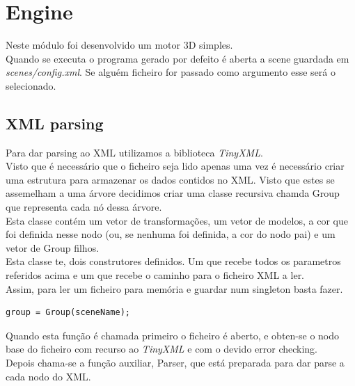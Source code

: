 \documentclass[a4paper]{report}
\begin{document}
\chapter{Engine}
Neste módulo foi desenvolvido um motor 3D simples.\\
Quando se executa o programa gerado por defeito é aberta a scene guardada em
\textit{scenes/config.xml}. Se alguém ficheiro for passado como argumento esse
será o selecionado.\\

\section{XML parsing}
Para dar parsing ao XML utilizamos a biblioteca \textit{TinyXML}.\\
Visto que é necessário que o ficheiro seja lido apenas uma vez é necessário
criar uma estrutura para armazenar os dados contidos no XML. Visto que estes se
assemelham a uma árvore decidimos criar uma classe recursiva chamda Group que
representa cada nó dessa árvore.\\
Esta classe contém um vetor de transformações, um vetor de modelos, a cor que
foi definida nesse nodo (ou, se nenhuma foi definida, a cor do nodo pai) e um
vetor de Group filhos.\\
Esta classe te, dois construtores definidos. Um que recebe todos os parametros
referidos acima e um que recebe o caminho para o ficheiro XML a ler.\\
Assim, para ler um ficheiro para memória e guardar num singleton basta fazer.

\begin{lstlisting}
group = Group(sceneName);
\end{lstlisting}
Quando esta função é chamada primeiro o ficheiro é aberto, e obten-se o nodo
base do ficheiro com recurso ao \textit{TinyXML} e com o devido error
checking.\\
Depois chama-se a função auxiliar, Parser, que está preparada para dar parse a
cada nodo do XML.
\end{document}
